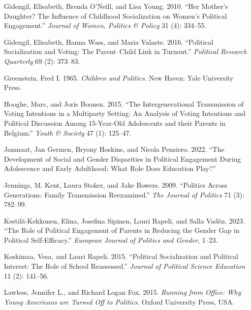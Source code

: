 \documentclass[
  letterpaper,
  DIV=11,
  numbers=noendperiod]{scrreprt}
\newlength{\cslhangindent}
\newlength{\cslentryspacingunit} %
\newenvironment{CSLReferences}[2] %
 {%
  \setlength{\parindent}{0pt}
  \ifodd #1
  \let\oldpar\par
  \def\par{\hangindent=\cslhangindent\oldpar}
  \fi
  \setlength{\parskip}{#2\cslentryspacingunit}
 }%
 {}
\begin{document}
\begin{CSLReferences}{1}{0}
\leavevmode{}%
Gidengil, Elisabeth, Brenda O'Neill, and Lisa Young. 2010. {``{Her
Mother's Daughter? The Influence of Childhood Socialization on Women's
Political Engagement}.''} \emph{Journal of Women, Politics \& Policy} 31
(4): 334--55.

\leavevmode{}%
Gidengil, Elisabeth, Hanna Wass, and Maria Valaste. 2016. {``{Political
Socialization and Voting: The Parent--Child Link in Turnout}.''}
\emph{Political Research Quarterly} 69 (2): 373--83.

\leavevmode{}%
Greenstein, Fred I. 1965. \emph{{Children and Politics}}. New Haven:
Yale University Press.

\leavevmode{}%
Hooghe, Marc, and Joris Boonen. 2015. {``{The Intergenerational
Transmission of Voting Intentions in a Multiparty Setting: An Analysis
of Voting Intentions and Political Discussion Among 15-Year-Old
Adolescents and their Parents in Belgium}.''} \emph{Youth \& Society} 47
(1): 125--47.

\leavevmode{}%
Janmaat, Jan Germen, Bryony Hoskins, and Nicola Pensiero. 2022. {``{The
Development of Social and Gender Disparities in Political Engagement
During Adolescence and Early Adulthood: What Role Does Education
Play?}''}

\leavevmode{}%
Jennings, M. Kent, Laura Stoker, and Jake Bowers. 2009. {``{Politics
Across Generations: Family Transmission Reexamined}.''} \emph{The
Journal of Politics} 71 (3): 782--99.

\leavevmode{}%
Kestilä-Kekkonen, Elina, Josefina Sipinen, Lauri Rapeli, and Salla
Vadén. 2023. {``{The Role of Political Engagement of Parents in Reducing
the Gender Gap in Political Self-Efficacy}.''} \emph{European Journal of
Politics and Gender}, 1--23.

\leavevmode{}%
Koskimaa, Vesa, and Lauri Rapeli. 2015. {``{Political Socialization and
Political Interest: The Role of School Reassessed}.''} \emph{Journal of
Political Science Education} 11 (2): 141--56.

\leavevmode{}%
Lawless, Jennifer L., and Richard Logan Fox. 2015. \emph{{Running from
Office: Why Young Americans are Turned Off to Politics}}. Oxford
University Press, USA.


\end{CSLReferences}
\end{document}
